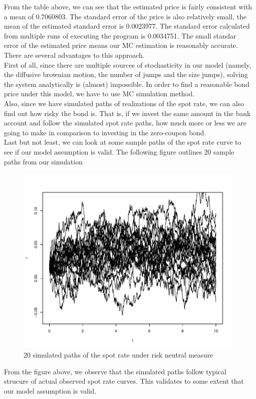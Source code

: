 From the table above, we can see that the estimated price is fairly consistent with a mean of 0.7060803. The standard error of the price is also relatively small, the mean of the estimated standard error is 0.0023977. The standard error calculated from multiple runs of executing the program is 0.0034751. The small standar error of the estimated price means our MC estimation is reasonably accurate. \\
There are several advantages to this approach.\\
First of all, since there are multiple sources of stochasticity in our model (namely, the diffusive brownian motion, the number of jumps and the size jumps), solving the system analytically is (almost) impossible. In order to find a reasonable bond price under this model, we have to use MC simulation method.\\
Also, since we have simulated paths of realizations of the spot rate, we can also find out how risky the bond is. That is, if we invest the same amount in the bank account and follow the simulated spot rate paths, how much more or less we are going to make in comparison to investing in the zero-coupon bond. \\
Last but not least, we can look at some sample paths of the spot rate curve to see if our model assumption is valid. The following figure outlines 20 sample paths from our simulation
\begin{figure}[H]
  \centering
\begin{knitrout}
\color{fgcolor}
\includegraphics[width=\maxwidth]{figure/p10plot-1} 

\end{knitrout}
		\caption{20 simulated paths of the spot rate under risk neutral measure}
\end{figure}
From the figure above, we observe that the simulated paths follow typical strucure of actual observed spot rate curves. This validates to some extent that our model assumption is valid. 
